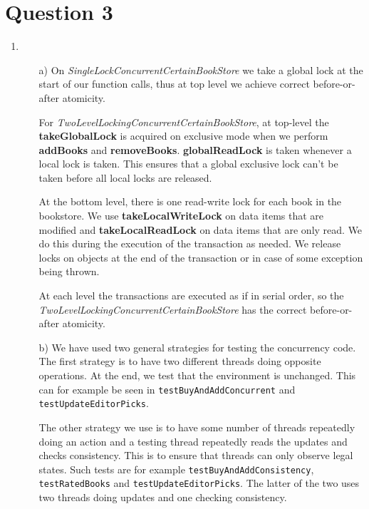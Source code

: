 \documentclass[11pt]{article}
\begin{document}
\section{Question 3}
\begin{enumerate}
	\item
		\begin{itemize}
		 \item[a)]
       On \textit{SingleLockConcurrentCertainBookStore} we take a global lock at
       the start of our function calls, thus at top level we achieve
       correct before-or-after atomicity.

       For \textit{TwoLevelLockingConcurrentCertainBookStore}, at top-level the
       \textbf{takeGlobalLock} is acquired on exclusive mode when we perform
       \textbf{addBooks} and \textbf{removeBooks}. \textbf{globalReadLock} is
       taken whenever a local lock is taken. This ensures that a global exclusive
       lock can't be taken before all local locks are released.

       At the bottom level, there is one read-write lock for each book in the
       bookstore. We use \textbf{takeLocalWriteLock} on data items that are modified and
       \textbf{takeLocalReadLock} on data items that are only read.
       We do this during the execution of the transaction as needed.
       We release locks on objects at the end of the transaction or in case of some
       exception being thrown.

       At each level the transactions are executed as if in serial order, so the
       \textit{TwoLevelLockingConcurrentCertainBookStore} has the correct
       before-or-after atomicity.
		
		\item[b)]
      We have used two general strategies for testing the concurrency code. The
      first strategy is to have two different threads doing opposite operations.
      At the end, we test that the environment is unchanged. This can for
      example be seen in \verb|testBuyAndAddConcurrent| and
      \verb|testUpdateEditorPicks|.

      The other strategy we use is to have some number of threads repeatedly
      doing an action and a testing thread repeatedly reads the updates and
      checks consistency. This is to ensure that threads can only observe legal
      states. Such tests are for example \verb|testBuyAndAddConsistency|,
      \verb|testRatedBooks| and \verb|testUpdateEditorPicks|. The latter of the
      two uses two threads doing updates and one checking consistency.


\end{itemize}
\end{enumerate}
\end{document}
